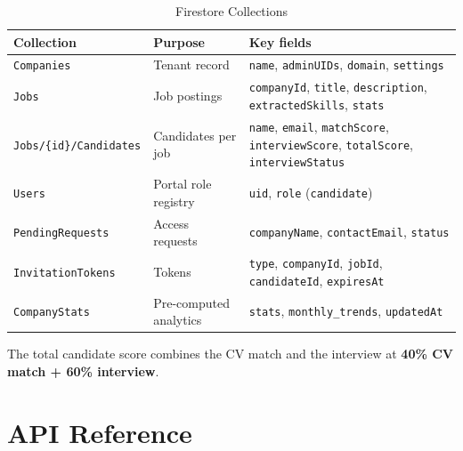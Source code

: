 \documentclass[12pt,a4paper,oneside]{report}
\begin{document}
\begin{table}[H]
\centering
\caption{Firestore Collections}
\label{tab:firestore}
\begin{tabularx}{\textwidth}{L{3.5cm}L{4.0cm}X}
\toprule
\textbf{Collection} & \textbf{Purpose} & \textbf{Key fields} \\
\midrule
\texttt{Companies}                  & Tenant record        & \texttt{name}, \texttt{adminUIDs}, \texttt{domain}, \texttt{settings} \\
\texttt{Jobs}                       & Job postings         & \texttt{companyId}, \texttt{title}, \texttt{description}, \texttt{extractedSkills}, \texttt{stats} \\
\texttt{Jobs/\{id\}/Candidates}     & Candidates per job   & \texttt{name}, \texttt{email}, \texttt{matchScore}, \texttt{interviewScore}, \texttt{totalScore}, \texttt{interviewStatus} \\
\texttt{Users}                      & Portal role registry & \texttt{uid}, \texttt{role} (\texttt{candidate}) \\
\texttt{PendingRequests}            & Access requests      & \texttt{companyName}, \texttt{contactEmail}, \texttt{status} \\
\texttt{InvitationTokens}           & Tokens               & \texttt{type}, \texttt{companyId}, \texttt{jobId}, \texttt{candidateId}, \texttt{expiresAt} \\
\texttt{CompanyStats}               & Pre-computed analytics & \texttt{stats}, \texttt{monthly\_trends}, \texttt{updatedAt} \\
\bottomrule
\end{tabularx}
\end{table}

The total candidate score combines the CV match and the interview at
\textbf{40\% CV match + 60\% interview}.

\section{API Reference}
\end{document}
